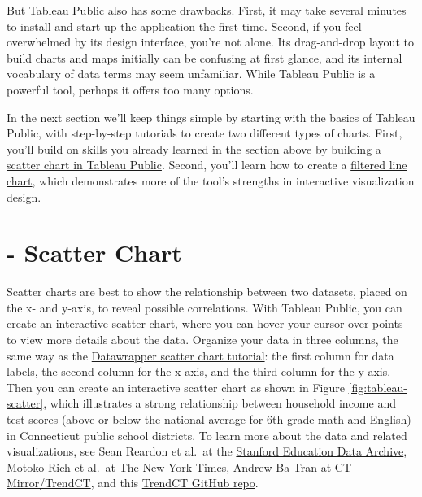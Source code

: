 \documentclass[
  english,
]{book}
\begin{document}
But Tableau Public also has some drawbacks. First, it may take several minutes to install and start up the application the first time. Second, if you feel overwhelmed by its design interface, you're not alone. Its drag-and-drop layout to build charts and maps initially can be confusing at first glance, and its internal vocabulary of data terms may seem unfamiliar. While Tableau Public is a powerful tool, perhaps it offers too many options.

In the next section we'll keep things simple by starting with the basics of Tableau Public, with step-by-step tutorials to create two different types of charts. First, you'll build on skills you already learned in the section above by building a \href{scatter-tableau.html}{scatter chart in Tableau Public}. Second, you'll learn how to create a \href{filtered-line-tableau.html}{filtered line chart}, which demonstrates more of the tool's strengths in interactive visualization design.

\hypertarget{scatter-tableau}{%
\section*{- Scatter Chart}\label{scatter-tableau}}

Scatter charts are best to show the relationship between two datasets, placed on the x- and y-axis, to reveal possible correlations. With Tableau Public, you can create an interactive scatter chart, where you can hover your cursor over points to view more details about the data. Organize your data in three columns, the same way as the \href{scatter-bubble-datawrapper.html}{Datawrapper scatter chart tutorial}: the first column for data labels, the second column for the x-axis, and the third column for the y-axis. Then you can create an interactive scatter chart as shown in Figure \ref{fig:tableau-scatter}, which illustrates a strong relationship between household income and test scores (above or below the national average for 6th grade math and English) in Connecticut public school districts. To learn more about the data and related visualizations, see Sean Reardon et al.~at the \href{https://purl.stanford.edu/db586ns4974}{Stanford Education Data Archive}, Motoko Rich et al.~at \href{https://www.nytimes.com/interactive/2016/04/29/upshot/money-race-and-success-how-your-school-district-compares.html}{The New York Times}, Andrew Ba Tran at \href{https://web.archive.org/web/20190129101923/http://trendct.org/2016/05/06/wealth-and-grades-compare-connecticuts-school-districts/}{CT Mirror/TrendCT}, and this \href{https://github.com/trendct-data/stanford-cepa}{TrendCT GitHub repo}.
\end{document}
